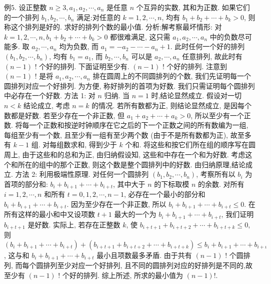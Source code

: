 例5. 设正整数 $n \geqslant 3, a_1, a_2, \cdots, a_n$ 是任意 $n$ 个互异的实数, 其和为正数.
如果它们的一个排列 $b_1, b_2, \cdots, b_n$ 满足:对任意的 $k=1,2, \cdots, n$, 均有 $b_1+b_2+\cdots+b_k>0$, 则称这个排列是好的.
求好的排列个数的最小值.
分析:解考察最坏情形: 对 $k=1,2, \cdots, n, b_1+b_2+\cdots+b_k>0$ 都很难满足, 这只需 $a_1, a_2, \cdots, a_n$ 中的负数尽可能多.
取 $a_2, \cdots, a_n$ 均为负数, 而 $a_1=-a_2-\cdots-a_n+1$. 此时任何一个好的排列 $\left(b_1, b_2, \cdots, b_n\right)$, 均有 $b_1= a_1$, 而 $b_2, \cdots, b_n$ 可以是 $a_2, \cdots, a_n$ 任意排列, 故此时有 $(n-1)$ ! 个好的排列.
下面证明至少有.
$(n-1)$ ! 个好的排列.
注意到 $(n-1)$ ! 是将 $a_1, a_2, \cdots, a_n$ 排在圆周上的不同圆排列的个数, 我们先证明每一个圆排列对应一个好排列.
为方便, 称好排列的首项为好数.
我们只需证明每个圆排列中必存在一个好数.
方法 1: 对 $n$ 归纳.
当 $n=1$ 时,结论显然成立.
假设对一切 $n<k$ 结论成立, 考虑 $n=k$ 的情况.
若所有数都为正, 则结论显然成立, 是因每个数都是好数.
若至少存在一个非正数, 但 $a_1+a_2+\cdots+a_k>0$, 所以至少有一个正数.
将每一个正数和按逆时钟顺序在它之后的下一个正数之间的所有数编为一组, 每组至少有一个数, 且至少有一组有至少两个数 (由于不是所有数都为正), 故至多有 $k-1$ 组.
对每组数求和, 得到少于 $k$ 个和.
将这些和按它们所在组的顺序写在圆周上, 由于这些和的总和为正, 由归纳假设知, 这些和中存在一个和为好数.
考虑这个和所在的组中的那个正数, 则这个数是整个圆排列中的好数.
由归纳原理,结论成立.
方法 2: 利用极端性原理.
对任何一个圆排列 $\left(b_1, b_2, \cdots, b_n\right)$, 考察所有以 $b_i$ 为首项的部分和: $b_i+b_{i+1}+\cdots+b_{i+t}$, 其中大于 $n$ 的下标取模 $n$ 的余数.
对所有 $i=1,2, \cdots, n$ 和所有 $t=0,1,2, \cdots, n-1$, 必存在一个最小的部分和 $b_i+b_{i+1}+\cdots+b_{i+t}$. 因为至少存在一个非正数, 所以 $b_i+b_{i+1}+\cdots+ b_{i+t} \leqslant 0$. 在所有这样的最小和中又设项数 $t+1$ 最大的一个为 $b_i+b_{i+1}+\cdots+ b_{i+t}$, 我们证明 $b_{i+t+1}$ 是好数.
实际上, 若存在正整数 $k$, 使 $b_{i+t+1}+b_{i+t+2}+\cdots+b_{i+t+k} \leqslant 0$, 则 $\left(b_i+\right. \left.b_{i+1}+\cdots+b_{i+t}\right)+\left(b_{i+t+1}+b_{i+t+2}+\cdots+b_{i+t+k}\right) \leqslant b_i+b_{i+1}+\cdots+b_{i+\iota}$, 这与和 $b_i+b_{i+1}+\cdots+b_{i+t}$ 最小且项数最多矛盾.
由于共有 $(n-1)$ ! 个圆排列, 而每个圆排列至少对应一个好排列, 且不同的圆排列对应的好排列是不同的,故至少有 $(n-1)$ ! 个好的排列.
综上所述, 所求的最小值为 $(n-1) !$.



